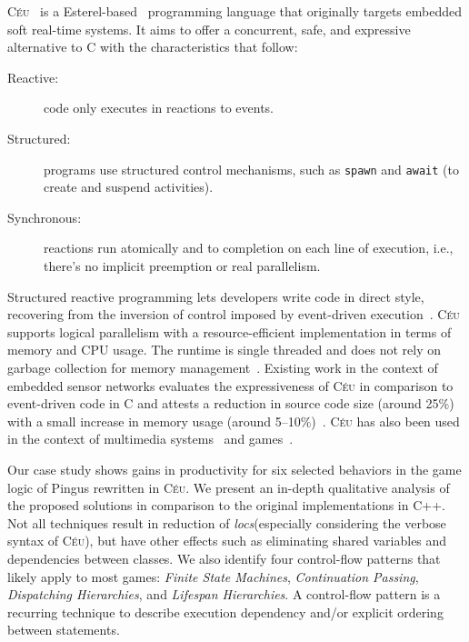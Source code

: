 \documentclass[10pt, conference, compsocconf]{IEEEtran}
\newcommand{\CEU}{\textsc{C\'{e}u}\xspace}
\newcommand{\locs}{\emph{locs}\xspace}
\newcommand{\code}[1] {{\small{\texttt{#1}}}}
\begin{document}
\CEU~\cite{ceu.sensys13,ceu.mod15} is a Esterel-based~\cite{esterel.ieee91}
programming language that originally targets embedded soft real-time systems.
It aims to offer a concurrent, safe, and expressive alternative to C with the
characteristics that follow:
%
\begin{description}
\item [Reactive:] code only executes in reactions to events.
\item [Structured:] programs use structured control mechanisms, such as
    \code{spawn} and \code{await} (to create and suspend activities).
\item [Synchronous:] reactions run atomically and to completion on each line of
    execution, i.e., there's no implicit preemption or real parallelism.
\end{description}
%
Structured reactive programming lets developers write code in direct style,
recovering from the inversion of control imposed by event-driven
execution~\cite{rp.deprecating,rp.rescala,sync_async.cooperative}.
%
%
\CEU supports logical parallelism with a resource-efficient implementation in
terms of memory and CPU usage.
The runtime is single threaded and does not rely on garbage collection for
memory management~\cite{ceu.sensys13}.
%
Existing work in the context of embedded sensor networks evaluates the
expressiveness of \CEU in comparison to event-driven code in C and attests a
reduction in source code size (around 25\%) with a small increase in memory
usage (around 5--10\%)~\cite{ceu.sensys13}.
%
\CEU has also been used in the context of multimedia
systems~\cite{ceumedia.webmedia16} and games~\cite{ceu.mod15}.

Our case study shows gains in productivity for six selected behaviors in the
game logic of Pingus rewritten in \CEU.
We present an in-depth qualitative analysis of the proposed solutions in
comparison to the original implementations in C++.
%
Not all techniques result in reduction of \locs (especially considering the
verbose syntax of \CEU), but have other effects such as eliminating shared
variables and dependencies between classes.
%
We also identify four control-flow patterns that likely apply to most games:
        \emph{Finite State Machines},
        \emph{Continuation Passing},
        \emph{Dispatching Hierarchies}, and
        \emph{Lifespan Hierarchies}.
%
A control-flow pattern is a recurring technique to describe execution
dependency and/or explicit ordering between statements.
\end{document}
